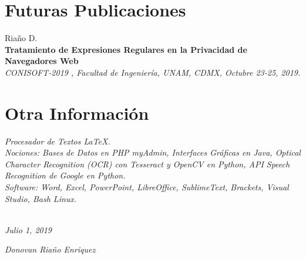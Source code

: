 \documentclass[]{friggeri-cv}
\begin{document}
\section{Futuras Publicaciones}
Riaño D.\\
\textbf{Tratamiento de Expresiones Regulares en la Privacidad de Navegadores Web}\\
\emph{CONISOFT-2019 , Facultad de Ingeniería, UNAM, CDMX, Octubre 23-25, 2019.}
\\
\section{Otra Información}

\emph{Procesador de Textos \LaTeX. \\ }
\emph{Nociones: Bases de Datos en PHP myAdmin, Interfaces Gráficas en Java, Optical Character Recognition (OCR) con Tesseract y OpenCV en Python, API Speech Recognition de Google en Python. \\}
\emph{Software: Word, Excel, PowerPoint, LibreOffice, SublimeText, Brackets, Visual Studio, Bash Linux.\\ }
\\
\begin{flushleft}
\emph{Julio 1, 2019}
\end{flushleft}
\begin{flushright}
\emph{Donovan Riaño Enriquez}
\end{flushright}

\clearpage

 
 
 
 


% 
\end{document}
